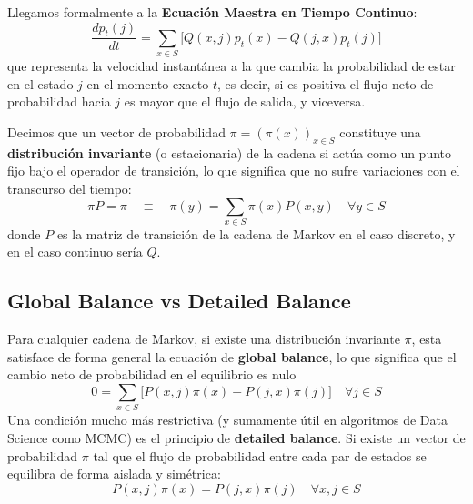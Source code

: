\noindent 
Llegamos formalmente a la \textbf{Ecuación Maestra en Tiempo Continuo}:
\begin{equation*}
    \frac{d p_t(j)}{dt} = \sum_{x \in S} \big[ Q(x, j) p_t(x) - Q(j, x) p_t(j) \big]
\end{equation*}
que representa la velocidad instantánea a la que cambia la probabilidad de estar en el estado $j$ en el momento exacto $t$, es decir, si es positiva el flujo neto de probabilidad hacia $j$ es mayor que el flujo de salida, y viceversa. 

\begin{definicion}
    Decimos que un vector de probabilidad $\pi = (\pi(x))_{x \in S}$ constituye una \textbf{distribución invariante} (o estacionaria) de la cadena si actúa como un punto fijo bajo el operador de transición, lo que significa que no sufre variaciones con el transcurso del tiempo:
    \begin{equation*}
        \pi P=\pi \quad \equiv \quad \pi(y) = \sum_{x \in S} \pi(x) P(x, y) \quad \forall y \in S
    \end{equation*}
    donde $P$ es la matriz de transición de la cadena de Markov en el caso discreto, y en el caso continuo sería $Q$.
\end{definicion}




\subsection{Global Balance vs Detailed Balance}
\noindent
\begin{definicion}
    Para cualquier cadena de Markov, si existe una distribución invariante $\pi$, esta satisface de forma general la ecuación de \textbf{global balance}, lo que significa que el cambio neto de probabilidad en el equilibrio es nulo
    \begin{equation*}
        0 = \sum_{x \in S} \big[ P(x, j)\pi(x) - P(j, x)\pi(j) \big] \quad \forall j \in S
    \end{equation*}
    Una condición mucho más restrictiva (y sumamente útil en algoritmos de Data Science como MCMC) es el principio de \textbf{detailed balance}. Si existe un vector de probabilidad $\pi$ tal que el flujo de probabilidad entre cada par de estados se equilibra de forma aislada y simétrica:
    \begin{equation*}
        P(x, j)\pi(x) = P(j, x)\pi(j) \quad \forall x, j \in S
    \end{equation*}
\end{definicion}

